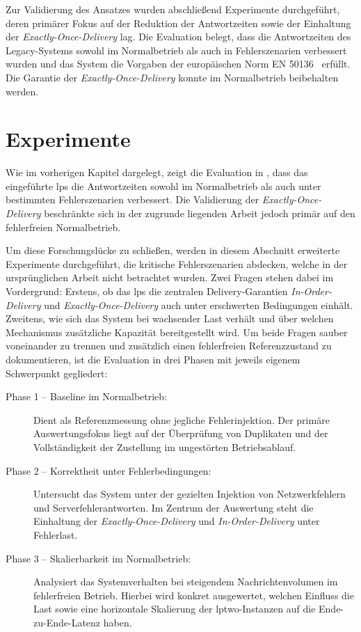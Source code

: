 Zur Validierung des Ansatzes wurden abschließend Experimente durchgeführt, deren primärer Fokus auf der Reduktion der Antwortzeiten sowie der Einhaltung der \textit{Exactly-Once-Delivery} lag. Die Evaluation belegt, dass die Antwortzeiten des Legacy-Systems sowohl im Normalbetrieb als auch in Fehlerszenarien verbessert wurden und das System die Vorgaben der europäischen Norm EN 50136~\citep{din_en_50136-12012-08_alarm_2012} erfüllt. Die Garantie der \textit{Exactly-Once-Delivery} konnte im Normalbetrieb beibehalten werden.

\section{Experimente}
\label{sec:mqtt-proxy-experimente}

Wie im vorherigen Kapitel dargelegt, zeigt die Evaluation in \citep{liebig_2025_architectural_refactoring}, dass das eingeführte \gls{lps} die Antwortzeiten sowohl im Normalbetrieb als auch unter bestimmten Fehlerszenarien verbessert. Die Validierung der \textit{Exactly-Once-Delivery} beschränkte sich in der zugrunde liegenden Arbeit jedoch primär auf den fehlerfreien Normalbetrieb.

Um diese Forschungslücke zu schließen, werden in diesem Abschnitt erweiterte Experimente durchgeführt, die kritische Fehlerszenarien abdecken, welche in der ursprünglichen Arbeit nicht betrachtet wurden. Zwei Fragen stehen dabei im Vordergrund: Erstens, ob das \gls{lps} die zentralen Delivery-Garantien \textit{In-Order-Delivery} und \textit{Exactly-Once-Delivery} auch unter erschwerten Bedingungen einhält. Zweitens, wie sich das System bei wachsender Last verhält und über welchen Mechanismus zusätzliche Kapazität bereitgestellt wird. Um beide Fragen sauber voneinander zu trennen und zusätzlich einen fehlerfreien Referenzzustand zu dokumentieren, ist die Evaluation in drei Phasen mit jeweils eigenem Schwerpunkt gegliedert:

\begin{description}
    \item[Phase 1 -- Baseline im Normalbetrieb:]
          Dient als Referenzmessung ohne jegliche Fehlerinjektion. Der primäre Auswertungsfokus liegt auf der Über\-prü\-fung von Duplikaten und der Vollständigkeit der Zustellung im ungestörten Betriebsablauf.

    \item[Phase 2 -- Korrektheit unter Fehlerbedingungen:]
          Untersucht das System unter der gezielten Injektion von Netzwerkfehlern und Serverfehlerantworten. Im Zentrum der Auswertung steht die Einhaltung der \textit{Exactly-Once-Delivery} und \textit{In-Order-Delivery} unter Fehlerlast.

    \item[Phase 3 -- Skalierbarkeit im Normalbetrieb:]
          Analysiert das Systemverhalten bei steigendem Nachrichtenvolumen im fehlerfreien Betrieb. Hierbei wird konkret ausgewertet, welchen Einfluss die Last sowie eine horizontale Skalierung der \gls{lptwo}-Instanzen auf die Ende-zu-Ende-Latenz haben.
\end{description}

